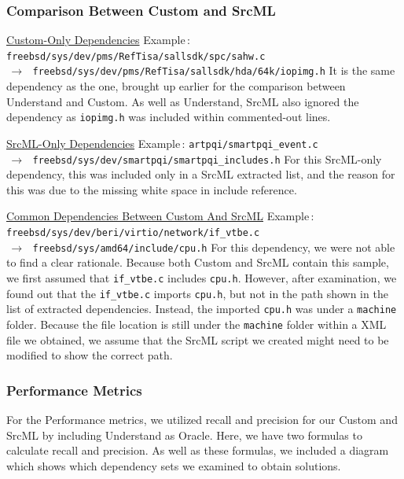 \documentclass[12pt, dvipsnames, a4paper]{article}
\begin{document}
\subsubsection{Comparison Between Custom and SrcML}
\underline{Custom-Only Dependencies}
\newline
\newline
Example$\,\colon\,$\texttt{freebsd/sys/dev/pms/RefTisa/sallsdk/spc/sahw.c \\$\,\to\,$ freebsd/sys/dev/pms/RefTisa/sallsdk/hda/64k/iopimg.h}
\newline
\newline
It is the same dependency as the one, brought up earlier for the comparison between Understand and Custom. As well as Understand, SrcML also ignored the dependency as \texttt{iopimg.h} was included within commented-out lines.

\underline{SrcML-Only Dependencies}
\newline
\newline
Example$\,\colon\,$\texttt{artpqi/smartpqi\_event.c \\$\,\to\,$ freebsd/sys/dev/smartpqi/smartpqi\_includes.h}
\newline
\newline
For this SrcML-only dependency, this was included only in a SrcML extracted list, and the reason for this was due to the missing white space in include reference.

\underline{Common Dependencies Between Custom And SrcML}
\newline
\newline
Example$\,\colon\,$\texttt{freebsd/sys/dev/beri/virtio/network/if\_vtbe.c \\$\,\to\,$ freebsd/sys/amd64/include/cpu.h}
\newline
\newline
For this dependency, we were not able to find a clear rationale. Because both Custom and SrcML contain this sample, we first assumed that \texttt{if\_vtbe.c} includes \texttt{cpu.h}. However, after examination, we found out that the \texttt{if\_vtbe.c} imports \texttt{cpu.h}, but not in the path shown in the list of extracted dependencies. Instead, the imported \texttt{cpu.h} was under a \texttt{machine} folder.
Because the file location is still under the \texttt{machine} folder within a XML file we obtained, we assume that the SrcML script we created might need to be modified to show the correct path.
\clearpage

\subsubsection{Performance Metrics}
For the Performance metrics, we utilized recall and precision for our Custom and SrcML by including Understand as Oracle.
Here, we have two formulas to calculate recall and precision. As well as these formulas, we included a diagram which shows which dependency sets we examined to obtain solutions.
\end{document}
